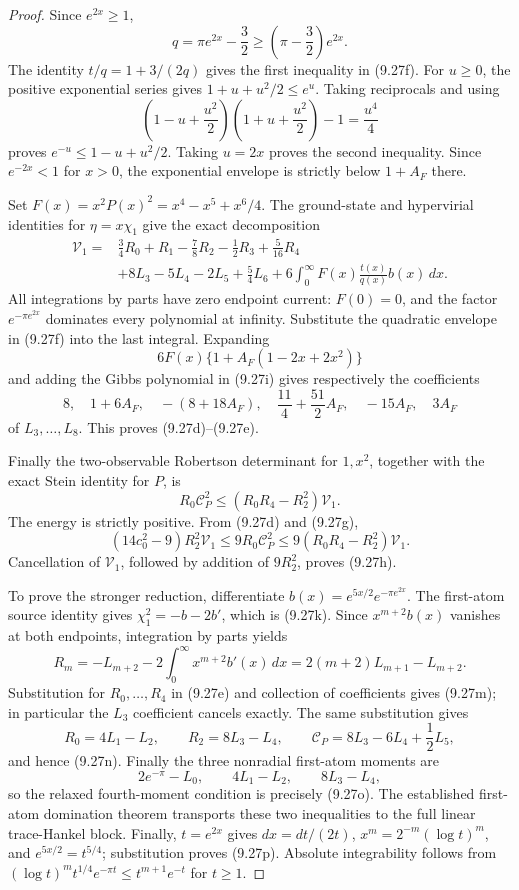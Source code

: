 \documentclass[11pt]{article}
\begin{document}
\begin{proof}
Since $e^{2x}\ge1$,
\[
 q=\pi e^{2x}-\frac32
 \ge\left(\pi-\frac32\right)e^{2x}.
\]
The identity $t/q=1+3/(2q)$ gives the first inequality in \textup{(9.27f)}.  For $u\ge0$,
the positive exponential series gives $1+u+u^2/2\le e^u$.  Taking reciprocals and using
\[
 \left(1-u+\frac{u^2}{2}\right)
 \left(1+u+\frac{u^2}{2}\right)-1=\frac{u^4}{4}
\]
proves $e^{-u}\le1-u+u^2/2$.  Taking $u=2x$ proves the second inequality.  Since
$e^{-2x}<1$ for $x>0$, the exponential envelope is strictly below $1+A_F$ there.

Set $F(x)=x^2P(x)^2=x^4-x^5+x^6/4$.  The ground-state and hypervirial identities for
$\eta=x\chi_1$ give the exact decomposition
\[
\begin{aligned}
 \mathcal V_1={}&
 \frac34R_0+R_1-\frac78R_2-\frac12R_3+\frac5{16}R_4\\
 &+8L_3-5L_4-2L_5+\frac54L_6
 +6\int_0^\infty F(x)\frac{t(x)}{q(x)}b(x)\,dx.
\end{aligned}
 \tag{9.27i}
\]
All integrations by parts have zero endpoint current: $F(0)=0$, and the factor
$e^{-\pi e^{2x}}$ dominates every polynomial at infinity.  Substitute the quadratic envelope
in \textup{(9.27f)} into the last integral.  Expanding
\[
 6F(x)\{1+A_F(1-2x+2x^2)\}
\]
and adding the Gibbs polynomial in \textup{(9.27i)} gives respectively the coefficients
\[
 8,\quad 1+6A_F,\quad -(8+18A_F),\quad
 \frac{11}{4}+\frac{51}{2}A_F,\quad -15A_F,\quad 3A_F
\]
of $L_3,\ldots,L_8$.  This proves \textup{(9.27d)}--\textup{(9.27e)}.

Finally the two-observable Robertson determinant for $1,x^2$, together with the exact Stein
identity for $P$, is
\[
 R_0\mathcal C_P^2\le(R_0R_4-R_2^2)\mathcal V_1.
 \tag{9.27j}
\]
The energy is strictly positive.  From \textup{(9.27d)} and \textup{(9.27g)},
\[
 (14c_0^2-9)R_2^2\mathcal V_1
 \le9R_0\mathcal C_P^2
 \le9(R_0R_4-R_2^2)\mathcal V_1.
\]
Cancellation of $\mathcal V_1$, followed by addition of $9R_2^2$, proves
\textup{(9.27h)}.

To prove the stronger reduction, differentiate
$b(x)=e^{5x/2}e^{-\pi e^{2x}}$.  The first-atom source identity gives
$\chi_1^2=-b-2b'$, which is \textup{(9.27k)}.  Since
$x^{m+2}b(x)$ vanishes at both endpoints, integration by parts yields
\[
 R_m=-L_{m+2}-2\int_0^\infty x^{m+2}b'(x)\,dx
     =2(m+2)L_{m+1}-L_{m+2}.
\]
Substitution for $R_0,\ldots,R_4$ in \textup{(9.27e)} and collection of coefficients gives
\textup{(9.27m)}; in particular the $L_3$ coefficient cancels exactly.  The same substitution
gives
\[
 R_0=4L_1-L_2,\qquad R_2=8L_3-L_4,\qquad
 \mathcal C_P=8L_3-6L_4+\frac12L_5,
\]
and hence \textup{(9.27n)}.  Finally the three nonradial first-atom moments are
\[
 2e^{-\pi}-L_0,\qquad 4L_1-L_2,\qquad 8L_3-L_4,
\]
so the relaxed fourth-moment condition is precisely \textup{(9.27o)}.  The established
first-atom domination theorem transports these two inequalities to the full linear
trace-Hankel block.  Finally, $t=e^{2x}$ gives $dx=dt/(2t)$,
$x^m=2^{-m}(\log t)^m$, and $e^{5x/2}=t^{5/4}$; substitution proves
\textup{(9.27p)}.  Absolute integrability follows from
$(\log t)^m t^{1/4}e^{-\pi t}\le t^{m+1}e^{-t}$ for $t\ge1$.
\end{proof}
\end{document}
